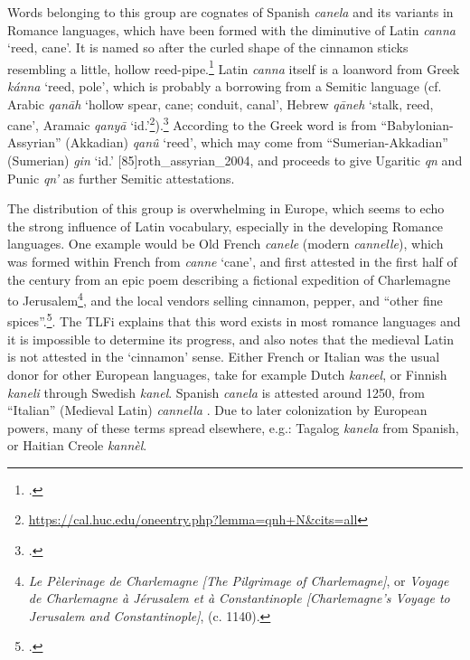 Words belonging to this group are cognates of Spanish \textit{canela} and its variants in Romance languages, which have been formed with the diminutive of Latin \textit{canna} `reed, cane'. It is named so after the curled shape of the cinnamon sticks resembling a little, hollow reed-pipe.\footcite[cannel]{oed} Latin \textit{canna} itself is a loanword from Greek 
\textit{kánna} `reed, pole', which is probably a borrowing from a Semitic language (cf. Arabic 
\textit{qan\={a}h} `hollow spear, cane; conduit, canal', Hebrew 
\textit{qāneh} `stalk, reed, cane', Aramaic  
\textit{qanyā} `id.'\footnote{\url{https://cal.huc.edu/oneentry.php?lemma=qnh+N&cits=all}}).\footcite[cane]{OED} According to \textcite[636]{beekes_etymological_2010} the Greek word is from ``Babylonian-Assyrian'' (Akkadian) \cu{\GA\NU\UU\UM} \textit{qanû} `reed', which may come from ``Sumerian-Akkadian'' (Sumerian) \cu{\GI} \textit{gin} `id.' [85]{roth_assyrian_2004}, and proceeds to give Ugaritic \textit{qn} and Punic \textit{qn'} as further Semitic attestations.

The distribution of this group is overwhelming in Europe, which seems to echo the strong influence of Latin vocabulary, especially in the developing Romance languages. One example would be Old French \textit{canele} (modern \textit{cannelle}), which was formed within French from \textit{canne} `cane', and first attested in the first half of the  century from an epic poem describing a fictional expedition of Charlemagne to Jerusalem\footnote{\textit{Le Pèlerinage de Charlemagne [The Pilgrimage of Charlemagne]}, or \textit{Voyage de Charlemagne à Jérusalem et à Constantinople [Charlemagne's Voyage to Jerusalem and Constantinople]}, (c. 1140).}, and the local vendors selling cinnamon, pepper, and ``other fine spices''.\footcite[cannelle ]{tlfi}. The \gls{TLFi} explains that this word exists in most romance languages and it is impossible to determine its progress, and also notes that the medieval Latin is not attested in the `cinnamon' sense. Either French or Italian was the usual donor for other European languages, take for example Dutch \textit{kaneel}, or Finnish \textit{kaneli} through Swedish \textit{kanel}. Spanish \textit{canela} is attested around 1250, from ``Italian'' (Medieval Latin) \textit{cannella} \autocites[125]{corominas_breve_1987}[98]{gomez_de_silva_elseviers_1985}. Due to later colonization by European powers, many of these terms spread elsewhere, e.g.: Tagalog \textit{kanela} from Spanish, or Haitian Creole \textit{kannèl}.

